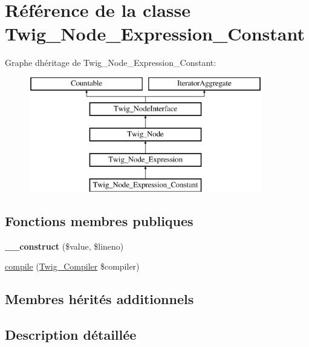 \hypertarget{class_twig___node___expression___constant}{}\section{Référence de la classe Twig\+\_\+\+Node\+\_\+\+Expression\+\_\+\+Constant}
\label{class_twig___node___expression___constant}
Graphe d\textquotesingle{}héritage de Twig\+\_\+\+Node\+\_\+\+Expression\+\_\+\+Constant\+:\begin{figure}[H]
\begin{center}
\leavevmode
\includegraphics[height=5.000000cm]{class_twig___node___expression___constant}
\end{center}
\end{figure}
\subsection*{Fonctions membres publiques}
\begin{DoxyCompactItemize}
\item 
{\bfseries \+\_\+\+\_\+construct} (\$value, \$lineno)\hypertarget{class_twig___node___expression___constant_a1f2b473cb4decd31a8d554e2356f39b4}{}\label{class_twig___node___expression___constant_a1f2b473cb4decd31a8d554e2356f39b4}

\item 
\hyperlink{class_twig___node___expression___constant_a4e0faa87c3fae583620b84d3607085da}{compile} (\hyperlink{class_twig___compiler}{Twig\+\_\+\+Compiler} \$compiler)
\end{DoxyCompactItemize}
\subsection*{Membres hérités additionnels}


\subsection{Description détaillée}


